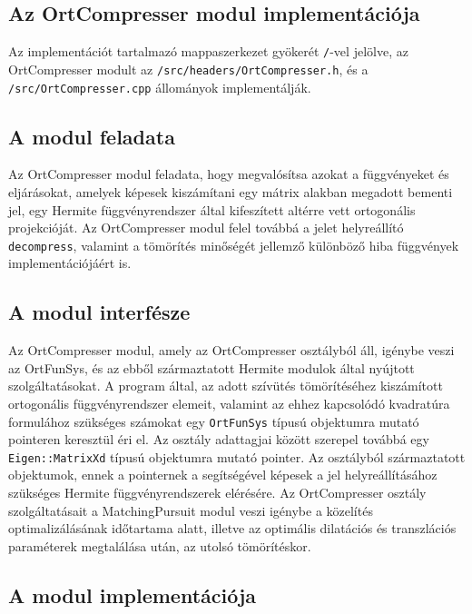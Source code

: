 \documentclass[oneside,titlepage,12pt,a4paper]{report}
\begin{document}
\subsection{Az OrtCompresser modul implementációja} \label{subsec::ortcompr}

Az implementációt tartalmazó mappaszerkezet gyökerét \texttt{/}-vel jelölve, az OrtCompresser modult  az \texttt{/src/headers/OrtCompresser.h}, és a \texttt{/src/OrtCompresser.cpp} állományok implementálják.

\subsection*{A modul feladata}

Az OrtCompresser modul feladata, hogy megvalósítsa azokat a függvényeket és eljárásokat, amelyek képesek kiszámítani egy mátrix alakban megadott bementi jel, egy Hermite függvényrendszer által kifeszített altérre vett ortogonális projekcióját. Az OrtCompresser modul felel továbbá a jelet helyreállító  \texttt{decompress}, valamint a tömörítés minőségét jellemző különböző hiba függvények implementációjáért is.

\subsection*{A modul interfésze}

\par Az OrtCompresser modul, amely az OrtCompresser osztályból áll, igénybe veszi az OrtFunSys, és az ebből származtatott Hermite modulok által nyújtott szolgáltatásokat. A program által, az adott szívütés tömörítéséhez kiszámított ortogonális függvényrendszer elemeit, valamint az ehhez kapcsolódó kvadratúra formulához szükséges számokat egy \texttt{OrtFunSys} típusú objektumra mutató pointeren keresztül éri el. Az osztály adattagjai között szerepel továbbá egy \texttt{Eigen::MatrixXd} típusú objektumra mutató pointer. Az osztályból származtatott objektumok, ennek a pointernek a segítségével képesek a jel helyreállításához szükséges Hermite függvényrendszerek elérésére. Az OrtCompresser osztály szolgáltatásait a MatchingPursuit modul veszi igénybe a közelítés optimalizálásának időtartama alatt, illetve az optimális dilatációs és transzlációs paraméterek megtalálása után, az utolsó tömörítéskor.  

\subsection*{A modul implementációja}
\end{document}
